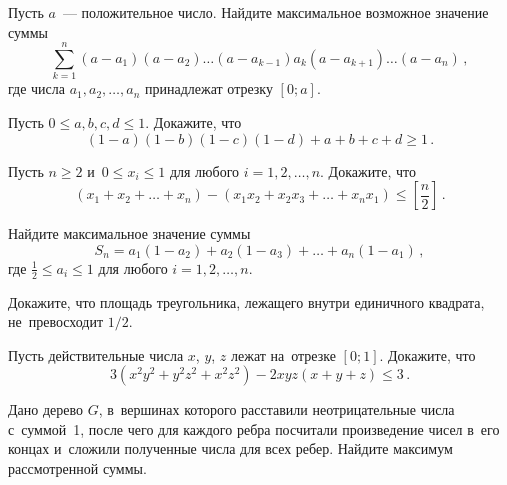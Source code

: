 



\begin{problems}


Пусть $a$~--- положительное число.
Найдите максимальное возможное значение суммы
\[
    \sum_{k = 1}^{n}
        (a - a_{1}) (a - a_{2})
        \ldots
        (a - a_{k-1}) a_{k} (a - a_{k+1})
        \ldots
        (a - a_{n})
\, , \]
где числа $a_{1}, a_{2}, \ldots, a_{n}$ принадлежат отрезку $[0; a]$.

\item
Пусть $0 \leq a, b, c, d \leq 1$.
Докажите, что
\[
    (1 - a) (1 - b) (1 - c) (1 - d) + a + b + c + d
\geq
    1
\, . \]

\item
Пусть $n \geq 2$ и~$0 \leq x_{i} \leq 1$ для любого $i = 1, 2, \ldots, n$.
Докажите, что
\[
    (x_{1} + x_{2} + \ldots + x_{n})
    - (x_{1} x_{2} + x_{2} x_{3} + \ldots + x_{n} x_{1})
\leq
    \left[ \frac{n}{2} \right]
\, . \]

\item
Найдите максимальное значение суммы
\[
    S_{n}
=
    a_{1} (1 - a_{2}) + a_{2} (1 - a_{3}) + \ldots + a_{n} (1 - a_{1})
\, , \]
где $\frac{1}{2} \leq a_{i} \leq 1$ для любого $i = 1, 2, \ldots, n$.

\item
Докажите, что площадь треугольника, лежащего внутри единичного квадрата,
не~превосходит $1/2$.

\item
Пусть действительные числа $x$, $y$, $z$ лежат на~отрезке $[0; 1]$.
Докажите, что
\[
    3 (x^2 y^2 + y^2 z^2 + x^2 z^2) - 2 x y z (x + y + z)
\leq
    3
\, . \]


\item
Дано дерево $G$, в~вершинах которого расставили неотрицательные числа
с~суммой~1, после чего для каждого ребра посчитали произведение чисел в~его
концах и~сложили полученные числа для всех ребер.
Найдите максимум рассмотренной суммы.


\end{problems}
